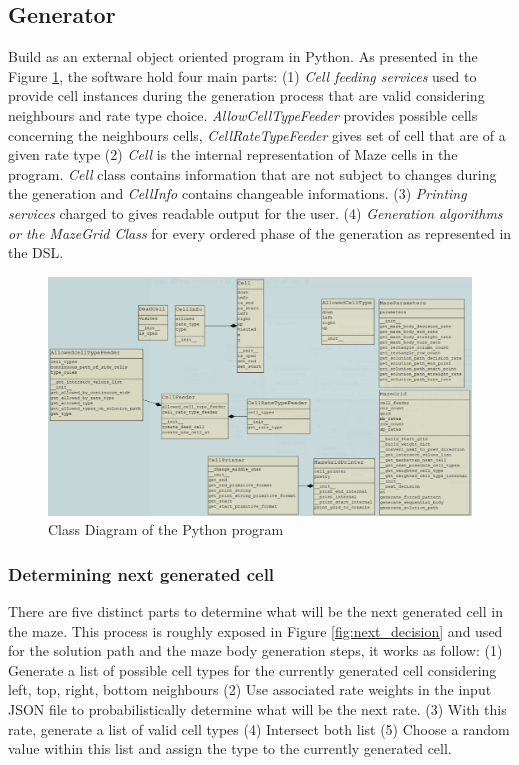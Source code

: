\documentclass[review]{elsarticle}
\begin{document}
\subsection{Generator}
Build as an external object oriented program in Python. As presented in the Figure \ref{fig:class_diagram}, the software hold four main parts: (1) \textit{Cell feeding services} used to provide cell instances during the generation process that are valid considering neighbours and rate type choice. \textit{AllowCellTypeFeeder} provides possible cells concerning the neighbours cells, \textit{CellRateTypeFeeder} gives set of cell that are of a given rate type (2) \textit{Cell} is the internal representation of Maze cells in the program. \textit{Cell} class contains information that are not subject to changes during the generation and \textit{CellInfo} contains changeable informations. (3) \textit{Printing services} charged to gives readable output for the user. (4) \textit{Generation algorithms or the MazeGrid Class} for every ordered phase of the generation as represented in the DSL.

\begin{figure}
	\includegraphics[width=\linewidth]{class_diagram.png}
	\caption{Class Diagram of the Python program}
	\label{fig:class_diagram}
\end{figure}

\subsubsection{Determining next generated cell}
There are five distinct parts to determine what will be the next generated cell in the maze. This process is roughly exposed in Figure \ref{fig:next_decision} and used for the solution path and the maze body generation steps, it works as follow: (1) Generate a list of possible cell types for the currently generated cell considering left, top, right, bottom neighbours (2) Use associated rate weights in the input JSON file to probabilistically determine what will be the next rate. (3) With this rate, generate a list of valid cell types (4) Intersect both list (5) Choose a random value within this list and assign the type to the currently generated cell.
\end{document}
